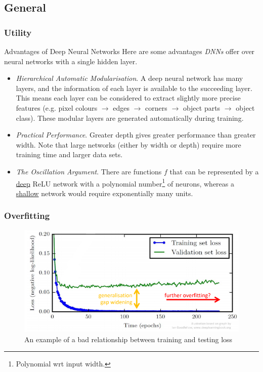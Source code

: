 \documentclass[11pt,a4paper]{article}
\begin{document}
\subsection{General} \label{sec_DNNGeneral}

\subsubsection{Utility} \label{sec_DNNUtility}

  \begin{remark}{Advantages of Deep Neural Networks}
    Here are some advantages \textit{DNNs} offer over neural networks with a single hidden layer.
    \begin{itemize}
      \item \textit{Hierarchical Automatic Modularisation}. A deep neural network has many layers, and the information of each layer is available to the succeeding layer. This means each layer can be considered to extract slightly more precise features (e.g. pixel colours $\to$ edges $\to$ corners $\to$ object parts $\to$ object class). These modular layers are generated automatically during training.
      \item \textit{Practical Performance}. Greater depth gives greater performance than greater width. Note that large networks (either by width or depth) require more training time and larger data sets.
      \item \textit{The Oscillation Argument}. There are functions $f$ that can be represented by a \underline{deep} ReLU network with a polynomial number\footnote{Polynomial wrt input width.} of neurons, whereas a \underline{shallow} network would require exponentially many units.
    \end{itemize}
  \end{remark}

\subsubsection{Overfitting} \label{sec_DNNOverfitting}

  \begin{figure}[H]
    \centering
    \includegraphics[width=.7\textwidth]{overfitting.PNG}
    \caption{An example of a bad relationship between training and testing loss}
    \label{fig_Overfitting}
  \end{figure}
\end{document}
